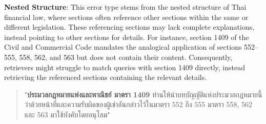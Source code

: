 
\textbf{Nested Structure}: This error type stems from the nested structure of Thai financial law, where sections often reference other sections within the same or different legislation. These referencing sections may lack complete explanations, instead pointing to other sections for details. For instance, section 1409 of the Civil and Commercial Code mandates the analogical application of sections 552–555, 558, 562, and 563 but does not contain their content. Consequently, retrievers might struggle to match queries with section 1409 directly, instead retrieving the referenced sections containing the relevant details.

\begin{quote}
    \begin{thai}
    "\textbf{ประมวลกฎหมายแพ่งและพาณิชย์ มาตรา 1409} ท่านให้นำบทบัญญัติแห่งประมวลกฎหมายนี้ว่าด้วยหน้าที่และความรับผิดของผู้เช่าอันกล่าวไว้ในมาตรา 552 ถึง 555 มาตรา 558, 562 และ 563 มาใช้บังคับโดยอนุโลม"        
    \end{thai}
\end{quote}


